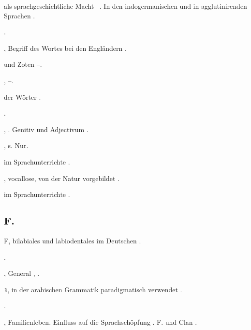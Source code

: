 \begin{register}
 als sprachgeschichtliche Macht \pageref{sp.215}–\pageref{sp.218}. In den indogermanischen und in agglutinirenden Sprachen \pageref{sp.403}.

 \pageref{sp.404}.

, Begriff des Wortes bei den Engländern \pageref{sp.179}.

 und Zoten \pageref{sp.248}–\pageref{sp.249}.

,  \pageref{sp.196}–\pageref{sp.205}.

 der Wörter \pageref{sp.157}.

 \pageref{sp.216}.

 \pageref{sp.150}, \pageref{sp.282}. Genitiv und Adjectivum \pageref{sp.455}.

, s. Nur.

 im Sprachunterrichte \pageref{sp.72}.

, vocallose, von der Natur vorgebildet \pageref{sp.314}.

 im Sprachunterrichte \pageref{sp.72}.


\subsection*{F.}\label{reg.F}

F, bilabiales und labiodentales im Deutschen \pageref{sp.188}.


 \pageref{sp.102}.


, General \pageref{sp.32}, \pageref{sp.69}.

\texttt{Ꜣ}, in der arabischen Grammatik paradigmatisch verwendet \pageref{sp.117}.

 \pageref{sp.282}.

, Familienleben. Einfluss auf die Sprachschöpfung \pageref{sp.306}. F. und Clan \pageref{sp.307}.



\end{register}
